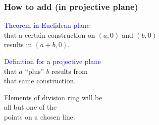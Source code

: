 \documentclass[14pt]{chalkfjord}
\begin{document}
\begin{frame}[label=plan-of-attack]
\frametitle{How to add (in projective plane)}

\textcolor{blue}{Theorem in Euclidean plane} \\
\quad that a certain construction on $(a,0)$ and $(b,0)$ \\
\quad results in $(a+b,0)$.

\vfill
\pause

\textcolor{blue}{Definition for a projective plane} \\
\quad that $a$ ``plus'' $b$ results from \\
\quad that same construction.

\vfill
\pause

Elements of division ring will be \\
\quad all but one of the \\
\quad points on a chosen line.

\end{frame}
\end{document}
